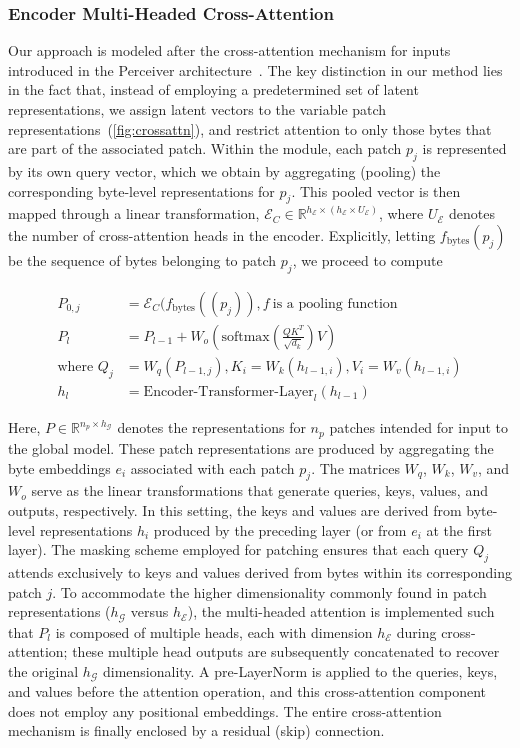\subsubsection{Encoder Multi-Headed Cross-Attention}
\label{sec:enc-cross-attn}
Our approach is modeled after the cross-attention mechanism for inputs introduced in the Perceiver architecture~\citep{jaegle2021perceiver}. The key distinction in our method lies in the fact that, instead of employing a predetermined set of latent representations, we assign latent vectors to the variable patch representations~(\autoref{fig:crossattn}), and restrict attention to only those bytes that are part of the associated patch. Within the module, each patch $p_j$ is represented by its own query vector, which we obtain by aggregating (pooling) the corresponding byte-level representations for $p_j$. This pooled vector is then mapped through a linear transformation, $\mathcal{E}_{C} \in \mathbb{R}^{h_{\mathcal{E}} \times (h_{\mathcal{E}} \times U_{\mathcal{E}})}$, where $U_{\mathcal{E}}$ denotes the number of cross-attention heads in the encoder. Explicitly, letting $f_{\text{bytes}}(p_j)$ be the sequence of bytes belonging to patch $p_j$, we proceed to compute

\begin{align}
P_{0,j} &= \mathcal{E}_{C}(f_\text{bytes}((p_j)), f~ \text{is a pooling function} \\
P_l &= P_{l-1} + W_o\left(\text{softmax}\left(\frac{QK^T}{\sqrt{d_k}}\right)V\right) \\
\text{where } Q_j &= W_q(P_{l-1,j}), K_i = W_k(h_{l-1,i}), V_i = W_v(h_{l-1,i}) \\
h_l &= \text{Encoder-Transformer-Layer}_l(h_{l-1})
\end{align}

Here, $P \in \mathbb{R}^{n_p \times h_{\mathcal{G}}}$ denotes the representations for $n_p$ patches intended for input to the global model. These patch representations are produced by aggregating the byte embeddings $e_i$ associated with each patch $p_j$. The matrices $W_q$, $W_k$, $W_v$, and $W_o$ serve as the linear transformations that generate queries, keys, values, and outputs, respectively. In this setting, the keys and values are derived from byte-level representations $h_i$ produced by the preceding layer (or from $e_i$ at the first layer). The masking scheme employed for patching ensures that each query $Q_j$ attends exclusively to keys and values derived from bytes within its corresponding patch $j$. To accommodate the higher dimensionality commonly found in patch representations ($h_{\mathcal{G}}$ versus $h_{\mathcal{E}}$), the multi-headed attention is implemented such that $P_l$ is composed of multiple heads, each with dimension $h_{\mathcal{E}}$ during cross-attention; these multiple head outputs are subsequently concatenated to recover the original $h_{\mathcal{G}}$ dimensionality. A pre-LayerNorm is applied to the queries, keys, and values before the attention operation, and this cross-attention component does not employ any positional embeddings. The entire cross-attention mechanism is finally enclosed by a residual (skip) connection.


